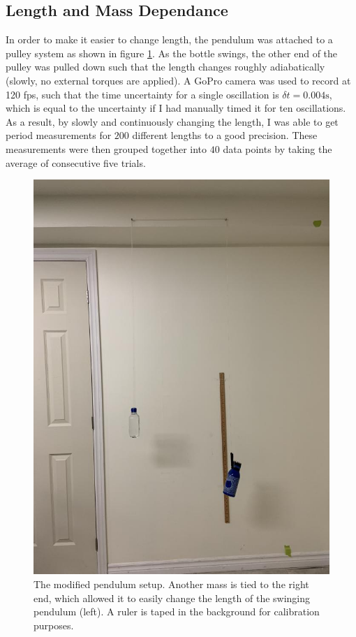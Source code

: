\documentclass[%
 reprint,
 amsmath,amssymb
 aps,
]{revtex4-2}
\begin{document}
\subsection{Length and Mass Dependance}
In order to make it easier to change length, the pendulum was attached to a pulley system as shown in figure \ref{fig:cool}. As the bottle swings, the other end of the pulley was pulled down such that the length changes roughly adiabatically (slowly, no external torques are applied). A GoPro camera was used to record at 120 fps, such that the time uncertainty for a single oscillation is $\delta t = 0.004 \si{\second}$, which is equal to the uncertainty if I had manually timed it for ten oscillations. As a result, by slowly and continuously changing the length, I was able to get period measurements for $200$ different lengths to a good precision. These measurements were then grouped together into $40$ data points by taking the average of consecutive five trials.
\begin{figure}[!h]
    \includegraphics[width=\linewidth]{figures/cool_beans.jpg}

    \caption{The modified pendulum setup. Another mass is tied to the right end, which allowed it to easily change the length of the swinging pendulum (left). A ruler is taped in the background for calibration purposes.}
    \label{fig:cool}
\end{figure}
\end{document}
